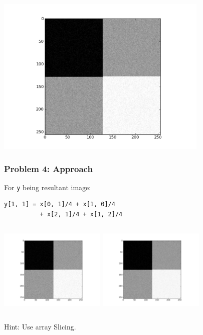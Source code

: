 \documentclass[14pt,compress]{beamer}
\newcommand{\typ}[1]{\lstinline{#1}}
\begin{document}
\begin{frame}
  \begin{center}
    \includegraphics[height=3in, interpolate=true]{data/smoothing}    
  \end{center}
\end{frame}

\begin{frame}[fragile]
  \frametitle{Problem 4: Approach}
  For \typ{y} being resultant image:
  \begin{lstlisting}
y[1, 1] = x[0, 1]/4 + x[1, 0]/4 
          + x[2, 1]/4 + x[1, 2]/4    
  \end{lstlisting}
   \begin{columns}
    \hspace*{-0.5in}
    \includegraphics[height=1.5in, interpolate=true]{data/smoothing}
    \hspace*{-0.5in}
    \includegraphics[height=1.5in, interpolate=true]{data/after-filter}
  \end{columns}
   \begin{block}{Hint:}
     Use array Slicing.
   \end{block}
\end{frame}
\end{document}
